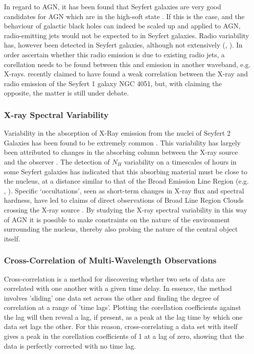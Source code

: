 \documentclass[letters,useAMS,usenatbib]{samnote}
\begin{document}
In regard to AGN, it has been found that Seyfert galaxies are very good candidates for AGN which are in the high-soft state \citep{mchardy04}. If this is the case, and
the behaviour of galactic black holes can indeed be scaled up and applied to AGN, radio-emitting jets would not be expected to in Seyfert galaxies. Radio variability has,
however been detected in Seyfert galaxies, although not extensively (\citet{neff83}, \citet{mundell09}). In order ascertain whether this radio emission is due to existing
radio jets, a corellation needs to be found between this and emission in another waveband, e.g. X-rays. \citet{king13} recently claimed to have found a weak correlation
between the X-ray and radio emission of the Seyfert 1 galaxy NGC 4051, but, with \citep{jones11} claiming the opposite, the matter is still under debate.


\subsubsection{X-ray Spectral Variability}

Variability in the absorption of X-Ray emission from the nuclei of Seyfert 2 Galaxies has been found to be extremely common \citep{risaliti02}. This variability has
largely been attributed to changes in the absorbing column between  the X-ray source and the observer \citep{risaliti02}. The detection of $N_H$ variability  on a
timescales of hours in some Seyfert galaxies has indicated that this absorbing material must be close to the nucleus, at a distance similar to that of the Broad Emission
Line Region (e.g. \citet{elvis04}, \citet{puccetti}). Specific `occultations', seen as short-term changes in X-ray flux and spectral hardness, have led to claims of
direct observations of Broad Line Region Clouds crossing the X-ray source \citep{risaliti07a}. By studying the X-ray spectral variability in this way of AGN it is
possible to make constraints on the nature of the environment surrounding the nucleus, thereby also probing the nature of the central object itself.

\subsubsection{Cross-Correlation of Multi-Wavelength Observations}

Cross-correlation is a method for discovering whether two sets of data are correlated with one another with a given time delay. In essence, the method involves 'sliding'
one data set across the other and finding the degree of correlation at a range of 'time lags'. Plotting the corellation coefficients against the lag will then reveal a
lag, if present, as a peak at the lag time by which one data set lags the other. For this reason, cross-correlating a data set with itself gives a peak in the corellation
coefficients of 1 at a lag of zero, showing that the data is perfectly corrected with no time lag.
\end{document}
